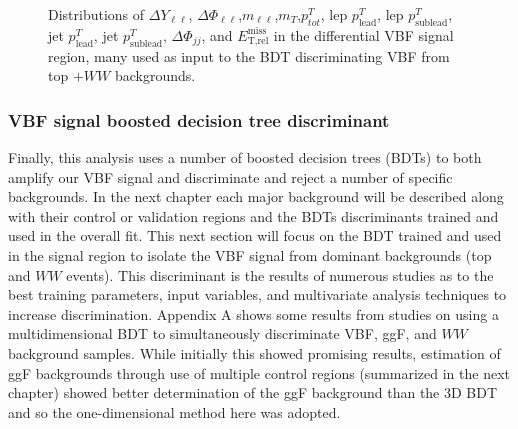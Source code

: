 \begin{figure}[!h]
{  }\hfill
  \hfill
{\caption{Distributions of $\Delta Y_{\ell\ell}$, $\Delta \Phi_{\ell\ell}$,$m_{\ell\ell}$,$m_T$,$p^T_{tot}$, lep $p^T_{\text{lead}}$, lep $p^T_{\text{sublead}}$, jet $p^T_{\text{lead}}$, jet $p^T_{\text{sublead}}$, $\Delta \Phi_{jj}$, and $\ensuremath{E_{\text{T,rel}}^{\text{miss}}}$ in the differential VBF signal region, many used as input to the BDT discriminating VBF from top $+WW$ backgrounds.
\label{fig:signalregion}}}
\end{figure}

\subsubsection{VBF signal boosted decision tree discriminant}
Finally, this analysis uses a number of boosted decision trees (BDTs) to both amplify our VBF signal and discriminate and reject a number of specific backgrounds. In the next chapter each major background will be described along with their control or validation regions and the BDTs discriminants trained and used in the overall fit. This next section will focus on the BDT trained and used in the signal region to isolate the VBF signal from dominant backgrounds (top and $WW$ events). This discriminant is the results of numerous studies as to the best training parameters, input variables, and multivariate analysis techniques to increase discrimination. Appendix A shows some results from studies on using a multidimensional BDT to simultaneously discriminate VBF, ggF, and $WW$ background samples. While initially this showed promising results, estimation of ggF backgrounds through use of multiple control regions (summarized in the next chapter) showed better determination of the ggF background than the 3D BDT and so the one-dimensional method here was adopted. 

